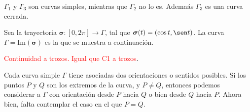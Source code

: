 \begin{example}
    $\Gamma_1$ y $\Gamma_3$ son curvas simples, mientras que $\Gamma_2$ no lo es. Adema\'as $\Gamma_3$ es una curva cerrada. 
\end{example}

\begin{example}
    Sea la trayectoria $\boldsymbol{\sigma}:[0,2\pi]\to\Gamma$, tal que $\boldsymbol{\sigma}(t)=(\cos t, \sen t)$. La curva $\Gamma=\text{Im}(\boldsymbol{\sigma})$ es la que se muestra a continuaci\'on.

    \begin{center}
    \end{center}
    
\end{example}

\begin{definition}
    \textcolor{red}{Continuidad a trozos. Igual que C1 a trozos}.
\end{definition}

\begin{obs}
    Cada curva simple $\Gamma$ tiene asociadas dos orientaciones o sentidos posibles. Si los puntos $P$ y $Q$ son los extremos de la curva, y $P\neq Q$, entonces podemos considerar a $\Gamma$ con orientaci\'on desde $P$ hacia $Q$ o bien desde $Q$ hacia $P$. Ahora bien, falta contemplar el caso en el que $P=Q$.
\end{obs}

